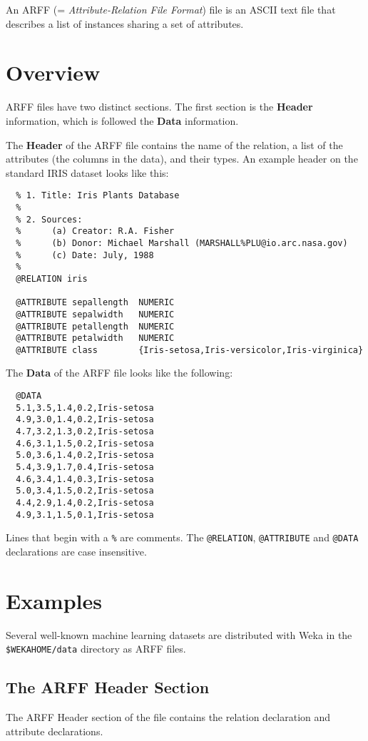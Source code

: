 
An ARFF (= \textit{Attribute-Relation File Format}) file is an ASCII text file that describes a list of instances sharing a set of attributes.

\section{Overview}
ARFF files have two distinct sections. The first section is the \textbf{Header} information, which is followed the \textbf{Data} information.

The \textbf{Header} of the ARFF file contains the name of the relation, a list of the attributes (the columns in the data), and their types. An example header on the standard IRIS dataset looks like this:

\begin{verbatim}
  % 1. Title: Iris Plants Database
  % 
  % 2. Sources:
  %      (a) Creator: R.A. Fisher
  %      (b) Donor: Michael Marshall (MARSHALL%PLU@io.arc.nasa.gov)
  %      (c) Date: July, 1988
  % 
  @RELATION iris

  @ATTRIBUTE sepallength  NUMERIC
  @ATTRIBUTE sepalwidth   NUMERIC
  @ATTRIBUTE petallength  NUMERIC
  @ATTRIBUTE petalwidth   NUMERIC
  @ATTRIBUTE class        {Iris-setosa,Iris-versicolor,Iris-virginica}
\end{verbatim}

\noindent The \textbf{Data} of the ARFF file looks like the following:

\begin{verbatim}
  @DATA
  5.1,3.5,1.4,0.2,Iris-setosa
  4.9,3.0,1.4,0.2,Iris-setosa
  4.7,3.2,1.3,0.2,Iris-setosa
  4.6,3.1,1.5,0.2,Iris-setosa
  5.0,3.6,1.4,0.2,Iris-setosa
  5.4,3.9,1.7,0.4,Iris-setosa
  4.6,3.4,1.4,0.3,Iris-setosa
  5.0,3.4,1.5,0.2,Iris-setosa
  4.4,2.9,1.4,0.2,Iris-setosa
  4.9,3.1,1.5,0.1,Iris-setosa
\end{verbatim}

Lines that begin with a \texttt{\%} are comments. The \texttt{@RELATION}, \texttt{@ATTRIBUTE} and \texttt{@DATA} declarations are case insensitive.


\section{Examples}
Several well-known machine learning datasets are distributed with Weka in the \texttt{\$WEKAHOME/data} directory as ARFF files.


\subsection{The ARFF Header Section}
The ARFF Header section of the file contains the relation declaration and attribute declarations. 


